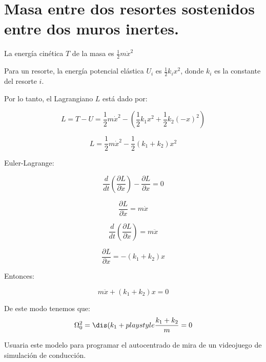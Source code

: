 \section{Masa entre dos resortes sostenidos entre dos muros inertes.}
La energía cinética $ T $ de la masa es $ \frac{1}{2} m \dot{x}^2 $

Para un resorte, la energía potencial elástica $ U_i $ es $ \frac{1}{2} k_i x^2 $, donde $ k_i $ es la constante del resorte $ i $.

Por lo tanto, el Lagrangiano $ L $ está dado por:

\[ L = T - U = \frac{1}{2} m \dot{x}^2 - \left( \frac{1}{2} k_1 x^2 + \frac{1}{2} k_2 (-x)^2 \right) \]

\[ L = \frac{1}{2} m \dot{x}^2 - \frac{1}{2} (k_1 + k_2) x^2 \]

Euler-Lagrange:

\[ \frac{d}{dt} \left( \frac{\partial L}{\partial \dot{x}} \right) - \frac{\partial L}{\partial x} = 0 \]

\[ \frac{\partial L}{\partial \dot{x}} = m \dot{x} \]

\[ \frac{d}{dt} \left( \frac{\partial L}{\partial \dot{x}} \right) = m \ddot{x} \]

\[ \frac{\partial L}{\partial x} = -(k_1 + k_2) x \]

Entonces:

\[ m \ddot{x} + (k_1 + k_2) x = 0 \]

De este modo tenemos que:
\[ \Omega_0^2 = \dis(k_1 +playstyle\frac{k_1 + k_2}{m} = 0 \]


Usuaria este modelo para programar el autocentrado de mira de un videojuego de simulación de conducción.

